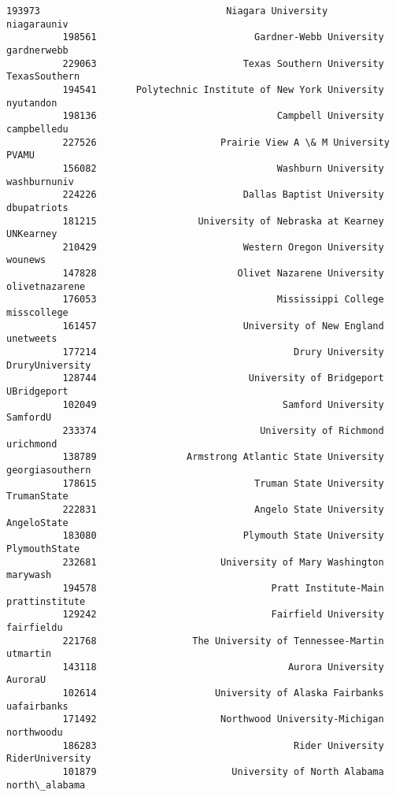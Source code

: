 \documentclass[11pt]{article}
\begin{document}
\begin{Verbatim}[commandchars=\\\{\}]
          193973                                 Niagara University      niagarauniv   
          198561                            Gardner-Webb University      gardnerwebb   
          229063                          Texas Southern University    TexasSouthern   
          194541       Polytechnic Institute of New York University        nyutandon   
          198136                                Campbell University      campbelledu   
          227526                      Prairie View A \& M University            PVAMU   
          156082                                Washburn University     washburnuniv   
          224226                          Dallas Baptist University      dbupatriots   
          181215                  University of Nebraska at Kearney        UNKearney   
          210429                          Western Oregon University          wounews   
          147828                         Olivet Nazarene University   olivetnazarene   
          176053                                Mississippi College      misscollege   
          161457                          University of New England        unetweets   
          177214                                   Drury University  DruryUniversity   
          128744                           University of Bridgeport      UBridgeport   
          102049                                 Samford University         SamfordU   
          233374                             University of Richmond        urichmond   
          138789                Armstrong Atlantic State University  georgiasouthern   
          178615                            Truman State University      TrumanState   
          222831                            Angelo State University      AngeloState   
          183080                          Plymouth State University    PlymouthState   
          232681                      University of Mary Washington         marywash   
          194578                               Pratt Institute-Main   prattinstitute   
          129242                               Fairfield University       fairfieldu   
          221768                 The University of Tennessee-Martin         utmartin   
          143118                                  Aurora University          AuroraU   
          102614                     University of Alaska Fairbanks      uafairbanks   
          171492                      Northwood University-Michigan       northwoodu   
          186283                                   Rider University  RiderUniversity   
          101879                        University of North Alabama    north\_alabama   

\end{Verbatim}
\end{document}
